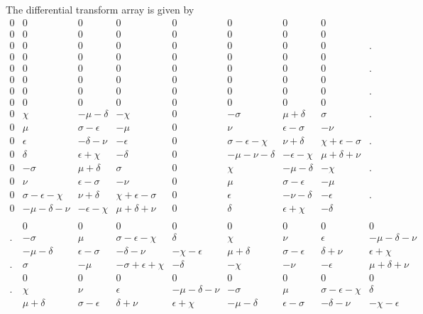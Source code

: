 \documentclass[12pt]{article}
\begin{document}
 The differential transform array is given by
\begin{displaymath}
\begin{array}{ccccccccc}
0 & 0 & 0 & 0 & 0 & 0 & 0 & 0 & \\
0 & 0 & 0 & 0 & 0 & 0 & 0 & 0 & \\
0 & 0 & 0 & 0 & 0 & 0 & 0 & 0 & .\\
0 & 0 & 0 & 0 & 0 & 0 & 0 & 0 & \\
0 & 0 & 0 & 0 & 0 & 0 & 0 & 0 & .\\
0 & 0 & 0 & 0 & 0 & 0 & 0 & 0 & \\
0 & 0 & 0 & 0 & 0 & 0 & 0 & 0 & .\\
0 & 0 & 0 & 0 & 0 & 0 & 0 & 0 & \\
0 & \chi & -\mu-\delta &-\chi& 0 & -\sigma&\mu+\delta& \sigma& .\\
0 & \mu &\sigma-\epsilon& -\mu& 0& \nu& \epsilon-\sigma& -\nu& \\
0 & \epsilon &-\delta-\nu&-\epsilon& 0&\sigma-\epsilon-\chi& \nu+\delta& \chi+\epsilon-\sigma& .\\
0 & \delta &\epsilon+\chi& -\delta& 0& -\mu-\nu-\delta& -\epsilon-\chi& \mu+\delta+\nu& \\
0 & -\sigma & \mu+\delta& \sigma& 0& \chi& -\mu-\delta& -\chi& .\\
0 & \nu & \epsilon-\sigma& -\nu& 0& \mu& \sigma-\epsilon& -\mu& \\
0 & \sigma-\epsilon-\chi & \nu+\delta& \chi+\epsilon-\sigma& 0& \epsilon& -\nu-\delta& -\epsilon& .\\
0 & -\mu-\delta-\nu & -\epsilon-\chi& \mu+\delta+\nu& 0& \delta& \epsilon+\chi& -\delta& \\
 & & & & & & & & \\
 & 0 & 0 & 0 & 0 & 0 & 0 & 0 & 0 \\
. & -\sigma & \mu& \sigma-\epsilon-\chi& \delta& \chi & \nu& \epsilon& -\mu-\delta-\nu \\
 & -\mu-\delta&\epsilon-\sigma&-\delta-\nu&-\chi-\epsilon&\mu+\delta&\sigma-\epsilon&\delta+\nu&\epsilon+\chi \\
. &  \sigma &-\mu&-\sigma+\epsilon+\chi&-\delta&-\chi &-\nu& -\epsilon& \mu+\delta+\nu \\
 & 0 & 0 & 0 & 0 & 0 & 0 & 0 & 0 \\
. & \chi & \nu & \epsilon &-\mu-\delta-\nu&-\sigma& \mu&\sigma-\epsilon-\chi& \delta \\
 & \mu+\delta&\sigma-\epsilon&\delta+\nu&\epsilon+\chi &-\mu-\delta&\epsilon-\sigma&-\delta-\nu&-\chi-\epsilon \\

\end{array}
\end{displaymath}
\end{document}
